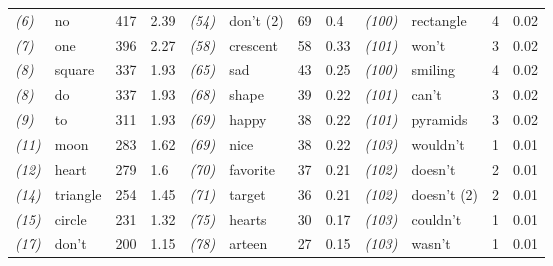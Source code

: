 \begin{screenonly}
\begin{table*}[h]
\begin{tabular*}{\hsize}{@{\extracolsep{\fill}}llllllllllll}
    \textsl{(6)} & no & 417 & 2.39 & \hspace*{2ex}\textsl{(54)} & don't (2) & 69 & 0.4 & \hspace*{2ex}\textsl{(100)} & rectangle & 4 & 0.02\\
    \textsl{(7)} & one & 396 & 2.27 & \hspace*{2ex}\textsl{(58)} & crescent & 58 & 0.33 & \hspace*{2ex}\textsl{(101)} & won't & 3 & 0.02\\
    \textsl{(8)} & square & 337 & 1.93 & \hspace*{2ex}\textsl{(65)} & sad & 43 & 0.25 & \hspace*{2ex}\textsl{(100)} & smiling & 4 & 0.02\\
    \textsl{(8)} & do & 337 & 1.93 & \hspace*{2ex}\textsl{(68)} & shape & 39 & 0.22 & \hspace*{2ex}\textsl{(101)} & can't & 3 & 0.02\\
    \textsl{(9)} & to & 311 & 1.93 & \hspace*{2ex}\textsl{(69)} & happy & 38 & 0.22 & \hspace*{2ex}\textsl{(101)} & pyramids & 3 & 0.02\\
    \textsl{(11)} & moon & 283 & 1.62 & \hspace*{2ex}\textsl{(69)} & nice & 38 & 0.22 & \hspace*{2ex}\textsl{(103)} & wouldn't & 1 & 0.01\\
    \textsl{(12)} & heart & 279 & 1.6 & \hspace*{2ex}\textsl{(70)} & favorite & 37 & 0.21 & \hspace*{2ex}\textsl{(102)} & doesn't & 2 & 0.01\\
    \textsl{(14)} & triangle & 254 & 1.45 & \hspace*{2ex}\textsl{(71)} & target & 36 & 0.21 & \hspace*{2ex}\textsl{(102)} & doesn't (2) & 2 & 0.01\\
    \textsl{(15)} & circle & 231 & 1.32 & \hspace*{2ex}\textsl{(75)} & hearts & 30 & 0.17 & \hspace*{2ex}\textsl{(103)} & couldn't & 1 & 0.01\\
    \textsl{(17)} & don't & 200 & 1.15 & \hspace*{2ex}\textsl{(78)} & arteen & 27 & 0.15 & \hspace*{2ex}\textsl{(103)} & wasn't & 1 & 0.01\\

\end{tabular*}
\end{table*}
\end{screenonly}
